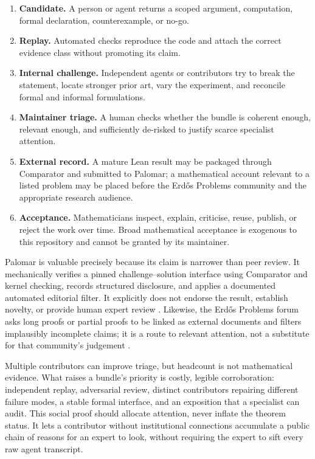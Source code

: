 \documentclass[10pt]{article}
\begin{document}
\begin{enumerate}
\item \textbf{Candidate.}  A person or agent returns a scoped argument,
      computation, formal declaration, counterexample, or no-go.
\item \textbf{Replay.}  Automated checks reproduce the code and attach the
      correct evidence class without promoting its claim.
\item \textbf{Internal challenge.}  Independent agents or contributors try
      to break the statement, locate stronger prior art, vary the experiment,
      and reconcile formal and informal formulations.
\item \textbf{Maintainer triage.}  A human checks whether the bundle is
      coherent enough, relevant enough, and sufficiently de-risked to justify
      scarce specialist attention.
\item \textbf{External record.}  A mature Lean result may be packaged through
      Comparator and submitted to Palomar; a mathematical account relevant to
      a listed problem may be placed before the Erd\H{o}s Problems community
      and the appropriate research audience.
\item \textbf{Acceptance.}  Mathematicians inspect, explain, criticise, reuse,
      publish, or reject the work over time.  Broad mathematical acceptance is
      exogenous to this repository and cannot be granted by its maintainer.
\end{enumerate}

Palomar is valuable precisely because its claim is narrower than peer review.
It mechanically verifies a pinned challenge--solution interface using
Comparator and kernel checking, records structured disclosure, and applies a
documented automated editorial filter.  It explicitly does not endorse the
result, establish novelty, or provide human expert review \cite{palomar}.
Likewise, the Erd\H{o}s Problems forum asks long proofs or partial proofs to be
linked as external documents and filters implausibly incomplete claims; it is
a route to relevant attention, not a substitute for that community's
judgement \cite{erdosproblems}.

Multiple contributors can improve triage, but headcount is not mathematical
evidence.  What raises a bundle's priority is costly, legible corroboration:
independent replay, adversarial review, distinct contributors repairing
different failure modes, a stable formal interface, and an exposition that a
specialist can audit.  This social proof should allocate attention, never
inflate the theorem status.  It lets a contributor without institutional
connections accumulate a public chain of reasons for an expert to look,
without requiring the expert to sift every raw agent transcript.
\end{document}
